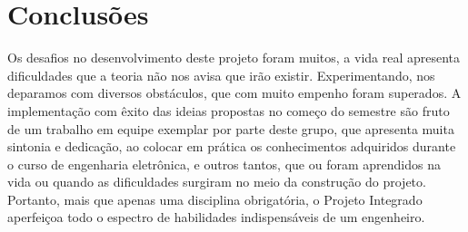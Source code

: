 \documentclass[a4paper,12pt]{report}
\begin{document}
\chapter{Conclusões}
	\label{cap:Conclusoes}
 	Os desafios no desenvolvimento deste projeto foram muitos, a vida real apresenta dificuldades que a teoria não nos avisa que irão existir. Experimentando, nos deparamos com diversos obstáculos, que com muito empenho foram superados. A implementação com êxito das ideias propostas no começo do semestre são fruto de um trabalho em equipe exemplar por parte deste grupo, que apresenta muita sintonia e dedicação, ao colocar em prática os conhecimentos adquiridos durante o curso de engenharia eletrônica, e outros tantos, que ou foram aprendidos na vida ou quando as dificuldades surgiram no meio da construção do projeto. Portanto, mais que apenas uma disciplina obrigatória, o Projeto Integrado aperfeiçoa todo o espectro de habilidades indispensáveis de um engenheiro. 
 
 
 
%
%	
	
	
	
	
	
	
	
	
	
	
	
		
	
	
	
\end{document}
